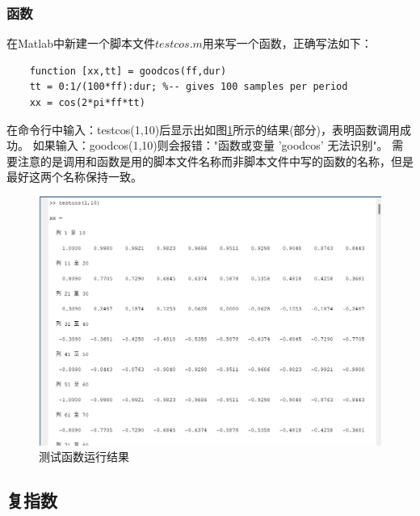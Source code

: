 \documentclass[UTF8]{ctexart}
\begin{document}
\subsubsection{函数}
在Matlab中新建一个脚本文件$testcos.m$用来写一个函数，正确写法如下：
\begin{verbatim}
    function [xx,tt] = goodcos(ff,dur) 
    tt = 0:1/(100*ff):dur; %-- gives 100 samples per period 
    xx = cos(2*pi*ff*tt)
\end{verbatim}
在命令行中输入：testcos(1,10)后显示出如图\ref{img:testcos}所示的结果(部分)，表明函数调用成功。
如果输入：goodcos(1,10)则会报错："函数或变量 'goodcos' 无法识别"。
需要注意的是调用和函数是用的脚本文件名称而非脚本文件中写的函数的名称，但是最好这两个名称保持一致。
\begin{figure}[htbp]
    \centering
    \includegraphics[width=0.7\linewidth]{testcos.png}
    \caption{测试函数运行结果}
    \label{img:testcos}
\end{figure}

\subsection{复指数}
\end{document}

